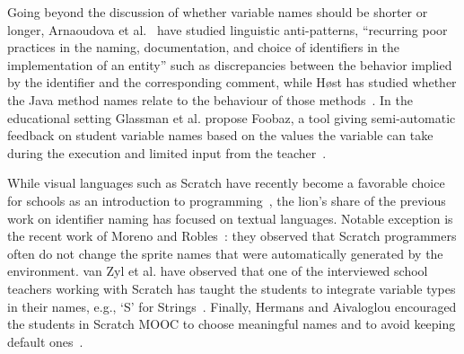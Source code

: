 \documentclass[conference]{IEEEtran}
\newcommand{\quotes}[1]{\textit{``#1''}}
\begin{document}
%
%

Going beyond the discussion of whether variable names should be shorter or longer, Arnaoudova et al.~\cite{ArnaoudovaPAG13,ArnaoudovaPA16} have studied linguistic anti-patterns, ``recurring poor practices in the naming, documentation, and choice of identifiers in the implementation of an entity'' such as discrepancies between the behavior implied by the identifier and the corresponding comment, while H{\o}st has studied whether the Java method names relate to the behaviour of those methods~\cite{Host11}.
In the educational setting Glassman et al. propose Foobaz, a tool giving semi-automatic feedback on student variable names based on the values the variable can take during the execution and limited input from the teacher~\cite{Glassman}.

While visual languages such as Scratch have recently become a favorable choice for schools as an introduction to programming~\cite{Matsuzawa}, the lion's share of the previous work on identifier naming has focused on textual languages.
Notable exception is the recent work of Moreno and Robles~\cite{MoreonoRobles}: they observed that Scratch programmers often do not change the sprite names that were automatically generated by the environment. 
van Zyl et al. have observed that one of the interviewed school teachers working with Scratch has taught the students to integrate variable types in their names, e.g., `S' for Strings~\cite{vanZyl}. Finally, Hermans and Aivaloglou encouraged the students in Scratch MOOC to choose meaningful names and to avoid keeping default ones~\cite{hermans_aivaloglou}.
\end{document}
